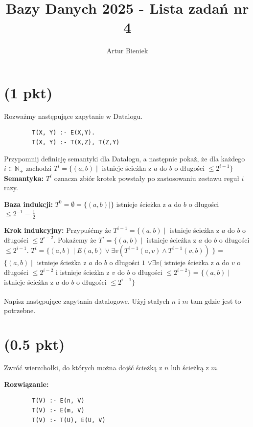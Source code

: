 \documentclass{article}
\begin{document}
\title{Bazy Danych 2025 - Lista zadań nr 4}
\author{Artur Bieniek}

\maketitle

\section{(1 pkt)}
Rozważmy następujące zapytanie w Datalogu.
\begin{verbatim}
        T(X, Y) :- E(X,Y).
        T(X, Y) :- T(X,Z), T(Z,Y)
\end{verbatim}
Przypomnij definicję semantyki dla Datalogu, a następnie pokaż, że dla każdego $i \in \mathbb{N}_{+}$ zachodzi $T^i = \{ (a,b) \mid $ istnieje ścieżka z  $a$ do $b$ o długości $\leq 2^{i-1} \}$
\newline
\textbf{Semantyka:} $T^i$ oznacza zbiór krotek powstały po zastosowaniu zestawu reguł $i$ razy.

\textbf{Baza indukcji:} $T^0 = \emptyset = \{(a,b) \mid \}$ istnieje ścieżka z $a$ do $b$ o długości $\leq 2^{-1}=\frac{1}{2}$

\textbf{Krok indukcyjny:} Przypuśćmy że $T^{i-1} = \{ (a,b) \mid$ istnieje ścieżka z $a$ do $b$ o długości $\leq 2^{i-2}$. Pokażemy że $T^{i} = \{ (a,b) \mid$ istnieje ścieżka z $a$ do $b$ o długości $\leq 2^{i-1}$.
\newline $T^{i} = \{(a,b) \mid E(a,b) \vee \exists v(T^{i-1}(a, v) \wedge T^{i-1}(v, b))$ $\}$
\newline = $\{(a,b) \mid $ istnieje ścieżka z $a$ do $b$ o długości $1$ $ \vee \exists v($ istnieje ścieżka z $a$ do $v$ o długości $\leq 2^{i-2}$ i istnieje ścieżka z $v$ do $b$ o długości $\leq 2^{i-2} \}$
\newline = $\{ (a,b) \mid$ istnieje ścieżka z $a$ do $b$ o długości $\leq 2^{i-1} \}$
\\~\\
Napisz następujące zapytania datalogowe. Użyj stałych $n$ i $m$ tam gdzie jest to potrzebne.


\section{(0.5 pkt)} Zwróć wierzchołki, do których można dojść ścieżką z $n$ lub ścieżką z $m$.

\textbf{Rozwiązanie:}
\begin{verbatim}
        T(V) :- E(n, V)
        T(V) :- E(m, V)
        T(V) :- T(U), E(U, V)
\end{verbatim}
\end{document}
